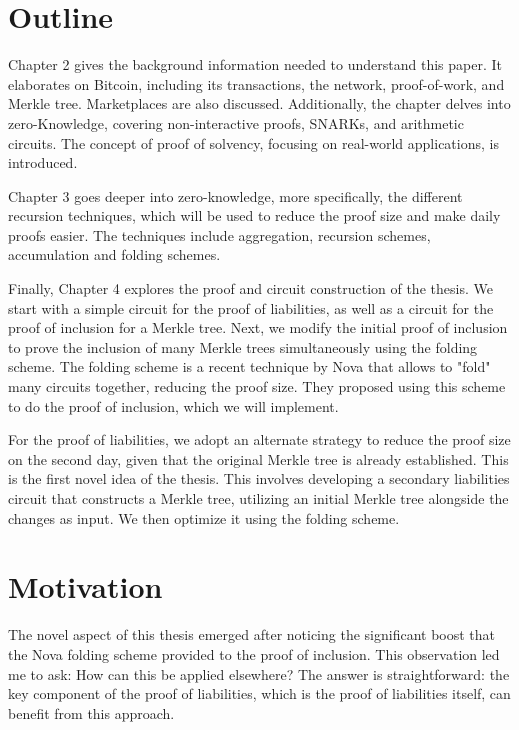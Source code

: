\section{Outline}

Chapter 2 gives the background information needed to understand this paper.
It elaborates on Bitcoin, including its transactions, the network, proof-of-work, and Merkle tree. Marketplaces are also discussed. 
Additionally, the chapter delves into zero-Knowledge, covering non-interactive proofs, SNARKs, and arithmetic circuits.
The concept of proof of solvency, focusing on real-world applications, is introduced. 

Chapter 3 goes deeper into zero-knowledge, more specifically, the different recursion techniques, which will be used to reduce the proof size and make 
daily proofs easier.
The techniques include aggregation, recursion schemes, accumulation and folding schemes.

Finally, Chapter 4 explores the proof and circuit construction of the thesis.
We start with a simple circuit for the proof of liabilities, as well as a circuit for the proof of inclusion for a Merkle tree.
Next, we modify the initial proof of inclusion to prove the inclusion of many Merkle trees simultaneously using the folding scheme.
The folding scheme is a recent technique by Nova that allows to "fold" many circuits together, reducing the proof size. 
They proposed using this scheme to do the proof of inclusion, which we will implement.

For the proof of liabilities, we adopt an alternate strategy to reduce the proof size on the second day, 
given that the original Merkle tree is already established. This is the first novel idea of the thesis.
This involves developing a secondary liabilities circuit that constructs a Merkle tree, utilizing an initial Merkle tree alongside the changes as input.
We then optimize it using the folding scheme.


\section{Motivation}
The novel aspect of this thesis emerged after noticing the significant boost that the Nova folding scheme provided
to the proof of inclusion. This observation led me to ask: How can this be applied elsewhere? The answer is straightforward: the key component of the proof of liabilities, 
which is the proof of liabilities itself, can benefit from this approach.

